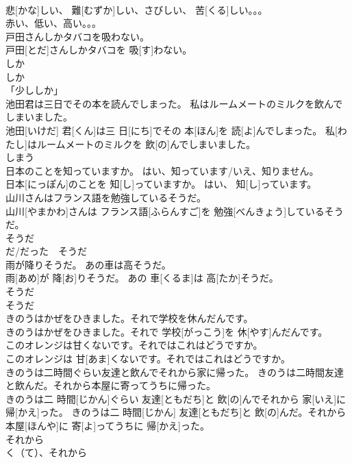 \documentclass[8pt]{extreport}
\begin{document}
\begin{CJK}{UTF8}{min}
\\	悲[かな]しい、 難[むずか]しい、さびしい、 苦[くる]しい。。。	
\\	赤い、低い、高い。。。
\\	戸田さんしかタバコを吸わない。	
\\	戸田[とだ]さんしかタバコを 吸[す]わない。	
\\	しか 
\\	しか　
\\	「少ししか」　
\\	池田君は三日でその本を読んでしまった。 私はルームメートのミルクを飲んでしまいました。	
\\	池田[いけだ] 君[くん]は三 日[にち]でその 本[ほん]を 読[よ]んでしまった。 私[わたし]はルームメートのミルクを 飲[の]んでしまいました。	
\\	しまう	
\\	日本のことを知っていますか。 はい、知っています/いえ、知りません。	
\\	日本[にっぽん]のことを 知[し]っていますか。 はい、 知[し]っています。	
\\	山川さんはフランス語を勉強しているそうだ。	
\\	山川[やまかわ]さんは フランス語[ふらんすご]を 勉強[べんきょう]しているそうだ。	
\\	そうだ 
\\	だ/だった　そうだ	
\\	雨が降りそうだ。 あの車は高そうだ。	
\\	雨[あめ]が 降[お]りそうだ。 あの 車[くるま]は 高[たか]そうだ。	
\\	そうだ 
\\	そうだ	
\\	きのうはかぜをひきました。それで学校を休んだんです。	
\\	きのうはかぜをひきました。それで 学校[がっこう]を 休[やす]んだんです。	
\\	このオレンジは甘くないです。それではこれはどうですか。	
\\	このオレンジは 甘[あま]くないです。それではこれはどうですか。	
\\	きのうは二時間ぐらい友達と飲んでそれから家に帰った。 きのうは二時間友達と飲んだ。それから本屋に寄ってうちに帰った。	
\\	きのうは二 時間[じかん]ぐらい 友達[ともだち]と 飲[の]んでそれから 家[いえ]に 帰[かえ]った。 きのうは二 時間[じかん] 友達[ともだち]と 飲[の]んだ。それから 本屋[ほんや]に 寄[よ]ってうちに 帰[かえ]った。	
\\	それから 
\\	く（て）、それから 

\end{CJK}
\end{document}
